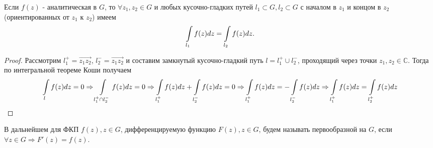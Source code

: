 
\begin{col-answer-preambule}
\end{col-answer-preambule}
\begin{consequence}
  Если $f(z)$ - аналитическая в $G$, то $\forall z_1, z_2 \in G$ и любых кусочно-гладких путей
  $l_1 \subset G, l_2 \subset G$ с началом в $z_1$ и концом в $z_2$ (ориентированных от $z_1$ к $z_2$)
  имеем
  \begin{align*}
    \int\limits_{l_1}f(z)dz = \int\limits_{l_2}f(z)dz.
  \end{align*}
\end{consequence}
\begin{proof}
  Рассмотрим $l_1^+ = \overrightarrow{z_1z_2}$, $l_2^- = \overrightarrow{z_1z_2}$ и составим замкнутый
  кусочно-гладкий путь $l = l_1^+ \cup l_2^-$, проходящий через точки $z_1, z_2 \in \mathbb{C}$.
  Тогда по интегральной теореме Коши получаем
  \begin{align*}
    \int\limits_lf(z)dz = 0 \Rightarrow \int\limits_{l_1^+\cap l_2^-}f(z)dz = 0 \Rightarrow
    \int\limits_{l_1^+}f(z)dz + \int\limits_{l_2^-}f(z)dz = 0 \Rightarrow
    \int\limits_{l_1^+}f(z)dz = -\int\limits_{l_2^-}f(z)dz \Rightarrow
    \int\limits_{l_1^+}f(z)dz = \int\limits_{l_2^+}f(z)dz
  \end{align*}
\end{proof}
В дальнейшем для ФКП $f(z), z \in G$, дифференцируемую функцию $F(z), z \in G$, будем называть
первообразной на $G$, если $\forall z \in G \Rightarrow F'(z) = f(z)$.
